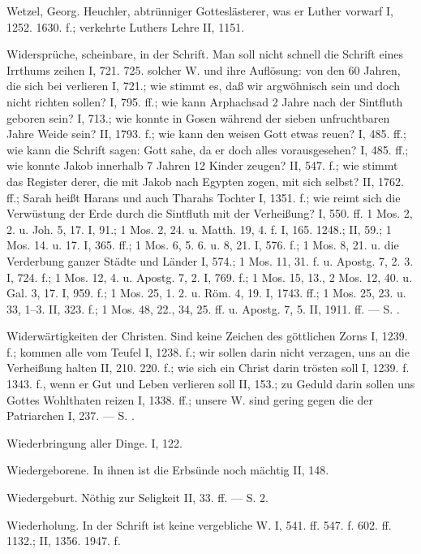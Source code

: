 Wetzel, Georg. Heuchler, abtrünniger Gotteslästerer, was er Luther vorwarf I, 1252. 1630. f.; verkehrte Luthers Lehre II, 1151.

Widersprüche, scheinbare, in der Schrift. Man soll nicht schnell die Schrift eines Irrthums zeihen I, 721. 725.  solcher W. und ihre Auflösung: von den 60 Jahren, die sich bei  verlieren I, 721.; wie stimmt es, daß wir argwöhnisch sein und doch nicht richten sollen? I, 795. ff.; wie kann Arphachsad 2 Jahre nach der Sintfluth geboren sein? I, 713.; wie konnte in Gosen während der sieben unfruchtbaren Jahre Weide sein? II, 1793. f.; wie kann den weisen Gott etwas reuen? I, 485. ff.; wie kann die Schrift sagen: Gott sahe, da er doch alles vorausgesehen? I, 485. ff.; wie konnte Jakob innerhalb 7 Jahren 12 Kinder zeugen? II, 547. f.; wie stimmt das Register derer, die mit Jakob nach Egypten zogen, mit sich selbst? II, 1762. ff.; Sarah heißt Harans und auch Tharahs Tochter I, 1351. f.; wie reimt sich die Verwüstung der Erde durch die Sintfluth mit der Verheißung? I, 550. ff.  1 Mos. 2, 2. u. Joh. 5, 17. I, 91.; 1 Mos. 2, 24. u. Matth. 19, 4. f. I, 165. 1248.; II, 59.; 1 Mos. 14. u. 17. I, 365. ff.; 1 Mos. 6, 5. 6. u. 8, 21. I, 576. f.; 1 Mos. 8, 21. u. die Verderbung ganzer Städte und Länder I, 574.; 1 Mos. 11, 31. f. u. Apostg. 7, 2. 3. I, 724. f.; 1 Mos. 12, 4. u. Apostg. 7, 2. I, 769. f.; 1 Mos. 15, 13., 2 Mos. 12, 40. u. Gal. 3, 17. I, 959. f.; 1 Mos. 25, 1. 2. u. Röm. 4, 19. I, 1743. ff.; 1 Mos. 25, 23. u. 33, 1–3. II, 323. f.; 1 Mos. 48, 22., 34, 25. ff. u. Apostg. 7, 5. II, 1911. ff. — S. .

Widerwärtigkeiten der Christen. Sind keine Zeichen des göttlichen Zorns I, 1239. f.; kommen alle vom Teufel I, 1238. f.; wir sollen darin nicht verzagen, uns an die Verheißung halten II, 210. 220. f.; wie sich ein Christ darin trösten soll I, 1239. f. 1343. f., wenn er Gut und Leben verlieren soll II, 153.; zu Geduld darin sollen uns Gottes Wohlthaten reizen I, 1338. ff.; unsere W. sind gering gegen die der Patriarchen I, 237. — S. .

Wiederbringung aller Dinge. I, 122.

Wiedergeborene. In ihnen ist die Erbsünde noch mächtig II, 148.

Wiedergeburt. Nöthig zur Seligkeit II, 33. ff. — S.  2.

Wiederholung. In der Schrift ist keine vergebliche W. I, 541. ff. 547. f. 602. ff. 1132.; II, 1356. 1947. f.

